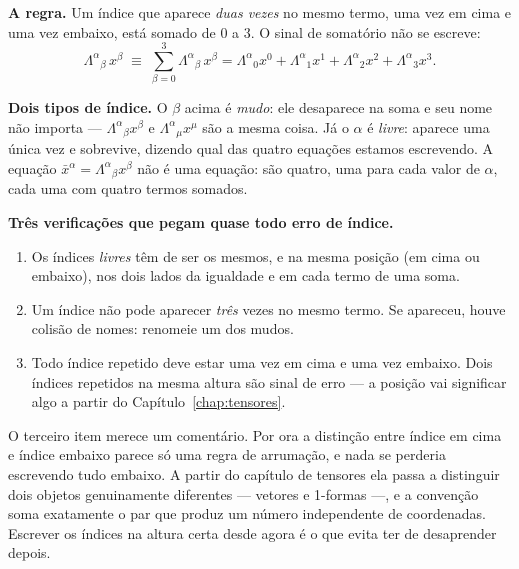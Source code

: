 \documentclass[12pt,a4paper,oneside]{book}
\theoremstyle{rgplain}
\theoremstyle{rgremark}
\begin{document}
\begin{resultado}[title={\sffamily\bfseries\footnotesize\color{rgAmbar}CONVENÇÃO DE SOMA DE EINSTEIN}]
\textbf{A regra.} Um índice que aparece \emph{duas vezes} no mesmo termo, uma
vez em cima e uma vez embaixo, está somado de $0$ a $3$. O sinal de somatório
não se escreve:
\[
  \Lambda^{\alpha}{}_{\beta}\,x^{\beta}
  \;\equiv\;
  \sum_{\beta=0}^{3}\Lambda^{\alpha}{}_{\beta}\,x^{\beta}
  =\Lambda^{\alpha}{}_{0}x^{0}+\Lambda^{\alpha}{}_{1}x^{1}
   +\Lambda^{\alpha}{}_{2}x^{2}+\Lambda^{\alpha}{}_{3}x^{3}.
\]

\textbf{Dois tipos de índice.} O $\beta$ acima é \emph{mudo}: ele desaparece na
soma e seu nome não importa --- $\Lambda^{\alpha}{}_{\beta}x^{\beta}$ e
$\Lambda^{\alpha}{}_{\mu}x^{\mu}$ são a mesma coisa. Já o $\alpha$ é
\emph{livre}: aparece uma única vez e sobrevive, dizendo qual das quatro
equações estamos escrevendo. A equação $\bar x^{\alpha}=\Lambda^{\alpha}{}_{\beta}x^{\beta}$
não é uma equação: são quatro, uma para cada valor de $\alpha$, cada uma com
quatro termos somados.

\textbf{Três verificações que pegam quase todo erro de índice.}
\begin{enumerate}
  \item Os índices \emph{livres} têm de ser os mesmos, e na mesma posição (em
  cima ou embaixo), nos dois lados da igualdade e em cada termo de uma soma.
  \item Um índice não pode aparecer \emph{três} vezes no mesmo termo. Se
  apareceu, houve colisão de nomes: renomeie um dos mudos.
  \item Todo índice repetido deve estar uma vez em cima e uma vez embaixo. Dois
  índices repetidos na mesma altura são sinal de erro --- a posição vai
  significar algo a partir do Capítulo~\ref{chap:tensores}.
\end{enumerate}
\end{resultado}

O terceiro item merece um comentário. Por ora a distinção entre índice em cima e
índice embaixo parece só uma regra de arrumação, e nada se perderia escrevendo
tudo embaixo. A partir do capítulo de tensores ela passa a distinguir dois
objetos genuinamente diferentes --- vetores e 1-formas ---, e a convenção
soma exatamente o par que produz um número independente de coordenadas. Escrever
os índices na altura certa desde agora é o que evita ter de desaprender depois.
\end{document}
